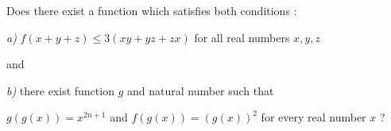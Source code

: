 Does there exist a function  which satisfies both conditions :

\textit{a)} $f( x + y + z) \leq 3(xy + yz + zx)$   for all real numbers $x , y , z$

and

\textit{b)} there exist function $g$  and natural number  such that

$g(g(x)) = x ^ {2n + 1}$    and         $f(g(x)) = (g(x)) ^2$  for every real number  $x$ ?